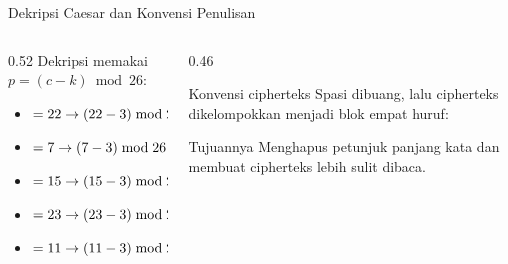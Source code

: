 \documentclass[aspectratio=169,11pt]{beamer}
\begin{document}
\begin{frame}{Dekripsi Caesar dan Konvensi Penulisan}
    \begin{columns}[T,onlytextwidth]
        \begin{column}{0.52\textwidth}
            Dekripsi memakai $p=(c-k)\bmod 26$:
            \begin{itemize}
                \item {} $=22 \rightarrow (22-3)\bmod 26=19=\texttt{t}$
                \item {} $=7 \rightarrow (7-3)\bmod 26=4=\texttt{e}$
                \item {} $=15 \rightarrow (15-3)\bmod 26=12=\texttt{m}$
                \item {} $=23 \rightarrow (23-3)\bmod 26=20=\texttt{u}$
                \item {} $=11 \rightarrow (11-3)\bmod 26=8=\texttt{i}$
            \end{itemize}
        \end{column}
        \begin{column}{0.46\textwidth}
            \begin{block}{Konvensi cipherteks}
                \footnotesize
                Spasi dibuang, lalu cipherteks dikelompokkan menjadi blok
                empat huruf: 
            \end{block}
            \begin{alertblock}{Tujuannya}
                \footnotesize
                Menghapus petunjuk panjang kata dan membuat cipherteks lebih
                sulit dibaca.
            \end{alertblock}
        \end{column}
    \end{columns}
\end{frame}
\end{document}
